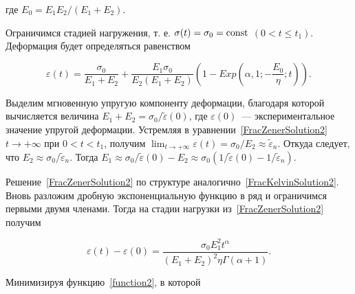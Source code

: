 \documentclass[11pt,a4paper,twoside]{article}
\begin{document}
где $E_{0}=E_{1}E_{2}/(E_{1}+E_{2})$.





Ограничимся стадией нагружения, т. е. $\sigma(t)=\sigma_{0}=\rm const$ $(0<t\leq t_{1})$. Деформация будет определяться равенством 


\begin{equation} \label{FracZenerSolution2}


\varepsilon(t)=\frac{\sigma_{0}}{E_{1}+E_{2}}+\frac{E_{1}\sigma_{0}}{E_{2}(E_{1}+E_{2})}\left(1-Exp\left(\alpha,1;-\frac{E_{0}}{\eta};t\right)\right).


\end{equation}


 


Выделим  мгновенную упругую компоненту деформации, благодаря которой вычисляется величина $E_{1}+E_{2}=\sigma_{0}/\tilde{\varepsilon}(0)$, где $\varepsilon(0)$~--- экспериментальное значение упругой деформации. Устремляя в уравнении~\eqref{FracZenerSolution2} $t\to+\infty$ при $0<t<t_{1}$, получим $\lim_{t\to+\infty}\varepsilon(t)=\sigma_{0}/E_{2}\approx\tilde{\varepsilon}_{n}$. Откуда следует, что $E_{2}\approx\sigma_{0}/\tilde{\varepsilon}_{n}$. Тогда  $E_{1}\approx \sigma_{0}/\tilde{\varepsilon}(0)-E_{2}\approx \sigma_{0}(1/\tilde{\varepsilon}(0)-1/\tilde{\varepsilon}_{n})$.


Решение~\eqref{FracZenerSolution2} по структуре аналогично~\eqref{FracKelvinSolution2}. Вновь разложим дробную экспоненциальную функцию в ряд и ограничимся первыми двумя членами. Тогда на стадии нагрузки из~\eqref{FracZenerSolution2} получим 


\begin{equation*}


\varepsilon(t)-\varepsilon(0)=\frac{\sigma_{0}E_{1}^{2}t^{\alpha}}{(E_{1}+E_{2})^{2}\eta\Gamma(\alpha+1)}.


\end{equation*}  










Минимизируя функцию~\eqref{function2}, в которой 
\end{document}
